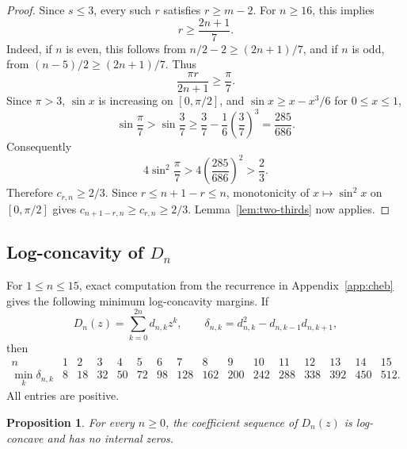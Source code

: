 \documentclass[11pt]{amsart}
\newtheorem{proposition}[theorem]{Proposition}
\begin{document}
\begin{proof}
Since \(s\le3\), every such \(r\) satisfies \(r\ge m-2\).  For \(n\ge16\), this implies
\[
        r\ge \frac{2n+1}{7}.
\]
Indeed, if \(n\) is even, this follows from \(n/2-2\ge(2n+1)/7\), and if \(n\) is odd, from \((n-5)/2\ge(2n+1)/7\).
Thus
\[
        \frac{\pi r}{2n+1}\ge \frac\pi7.
\]
Since \(\pi>3\), \(\sin x\) is increasing on \([0,\pi/2]\), and \(\sin x\ge x-x^3/6\) for \(0\le x\le1\),
\[
        \sin\frac\pi7>
        \sin\frac37
        \ge \frac37-\frac16\left(\frac37\right)^3
        =\frac{285}{686}.
\]
Consequently
\[
        4\sin^2\frac\pi7>
        4\left(\frac{285}{686}\right)^2>
        \frac23.
\]
Therefore \(c_{r,n}\ge2/3\).  Since \(r\le n+1-r\le n\), monotonicity of \(x\mapsto\sin^2 x\) on \([0,\pi/2]\) gives \(c_{n+1-r,n}\ge c_{r,n}\ge2/3\).  Lemma~\ref{lem:two-thirds} now applies.
\end{proof}

\subsection{Log-concavity of \texorpdfstring{\(D_n\)}{Dn}}

For \(1\le n\le15\), exact computation from the recurrence in Appendix~\ref{app:cheb} gives the following minimum log-concavity margins.  If
\[
        D_n(z)=\sum_{k=0}^{2n}d_{n,k}z^k,
        \qquad
        \delta_{n,k}=d_{n,k}^2-d_{n,k-1}d_{n,k+1},
\]
then
\[
\begin{array}{c|ccccccccccccccc}
 n&1&2&3&4&5&6&7&8&9&10&11&12&13&14&15\\
\hline
 \min_k\delta_{n,k}
 &8&18&32&50&72&98&128&162&200&242&288&338&392&450&512.
\end{array}
\]
All entries are positive.

\begin{proposition}\label{prop:Dn-log-concave}
For every \(n\ge0\), the coefficient sequence of \(D_n(z)\) is log-concave and has no internal zeros.
\end{proposition}
\end{document}
